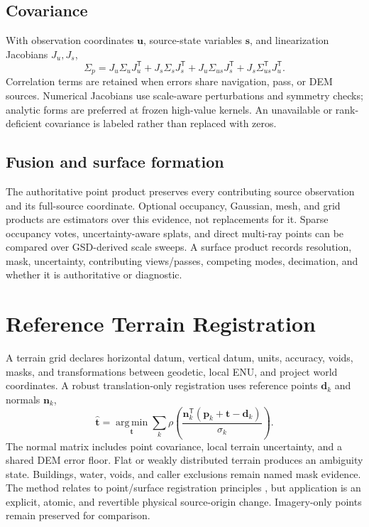 \documentclass[journal]{IEEEtran}
\newcommand{\T}{^{\mathsf T}}
\newcommand{\argmin}{\operatorname*{arg\,min}}
\begin{document}
\subsection{Covariance}

With observation coordinates $\bm u$, source-state variables $\bm s$, and
linearization Jacobians $J_u,J_s$,
\begin{equation}
\Sigma_p=J_u\Sigma_uJ_u\T+J_s\Sigma_sJ_s\T
+J_u\Sigma_{us}J_s\T+J_s\Sigma_{us}\T J_u\T.
\label{eq:pointcov}
\end{equation}
Correlation terms are retained when errors share navigation, pass, or DEM
sources. Numerical Jacobians use scale-aware perturbations and symmetry checks;
analytic forms are preferred at frozen high-value kernels. An unavailable or
rank-deficient covariance is labeled rather than replaced with zeros.

\subsection{Fusion and surface formation}

The authoritative point product preserves every contributing source
observation and its full-source coordinate. Optional occupancy, Gaussian,
mesh, and grid products are estimators over this evidence, not replacements for
it. Sparse occupancy votes, uncertainty-aware splats, and direct multi-ray
points can be compared over GSD-derived scale sweeps. A surface product records
resolution, mask, uncertainty, contributing views/passes, competing modes,
decimation, and whether it is authoritative or diagnostic.

\section{Reference Terrain Registration}

A terrain grid declares horizontal datum, vertical datum, units, accuracy,
voids, masks, and transformations between geodetic, local ENU, and project
world coordinates. A robust translation-only registration uses reference
points $\bm d_k$ and normals $\bm n_k$,
\begin{equation}
\widehat{\bm t}=\argmin_{\bm t}\sum_k
\rho\!\left(\frac{\bm n_k\T(\bm p_k+\bm t-\bm d_k)}{\sigma_k}\right).
\label{eq:demobjective}
\end{equation}
The normal matrix includes point covariance, local terrain uncertainty, and a
shared DEM error floor. Flat or weakly distributed terrain produces an
ambiguity state. Buildings, water, voids, and caller exclusions remain named
mask evidence. The method relates to point/surface registration principles
\cite{BeslMcKay1992,Censi2007}, but application is an explicit, atomic, and
revertible physical source-origin change. Imagery-only points remain preserved
for comparison.
\end{document}
